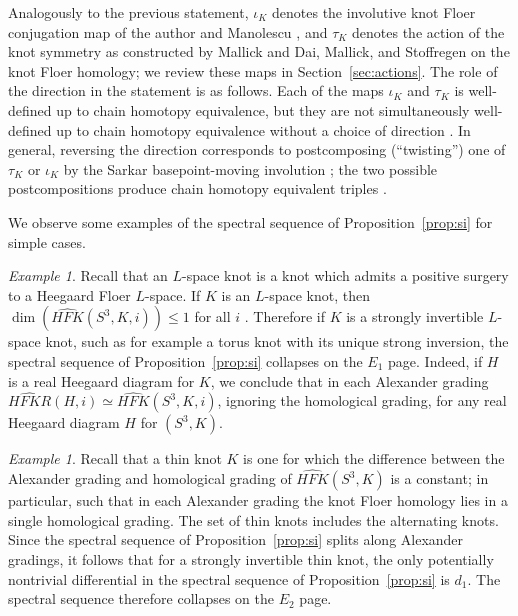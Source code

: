 \documentclass[11pt,reqno]{amsart}
\theoremstyle{definition}
\theoremstyle{remark}
\newtheorem{example}[thm]{Example}
\newcommand{\HFK}{\mathit{HFK}}
\newcommand\HFKhat{\widehat{\HFK}}
\newcommand \HFKR{ \widehat{\mathit{HFKR}}}
\numberwithin{equation}{section}
\begin{document}
Analogously to the previous statement, $\iota_K$ denotes the involutive knot Floer conjugation map of the author and Manolescu \cite{HMInvolutive}, and $\tau_K$ denotes the action of the knot symmetry as constructed by Mallick \cite{Mallick:surgery} and Dai, Mallick, and Stoffregen \cite{DMS:equivariant} on the knot Floer homology; we review these maps in Section~\ref{sec:actions}. The role of the direction in the statement is as follows. Each of the maps $\iota_K$ and $\tau_K$ is well-defined up to chain homotopy equivalence, but they are not simultaneously well-defined up to chain homotopy equivalence without a choice of direction \cite[Section 3.5]{DMS:equivariant}. In general, reversing the direction corresponds to postcomposing (``twisting'') one of $\tau_K$ or $\iota_K$ by the Sarkar basepoint-moving involution \cite{SarkarMovingBasepoints, ZemQuasi}; the two possible postcompositions produce chain homotopy equivalent triples \cite[Lemma 2.21]{DMS:equivariant}.

We observe some examples of the spectral sequence of Proposition~\ref{prop:si} for simple cases.

\begin{example} Recall that an $L$-space knot is a knot which admits a positive surgery to a Heegaard Floer $L$-space. If $K$ is an $L$-space knot, then $\dim(\HFKhat(S^3, K, i)) \leq 1$ for all $i$ \cite{OSlens}. Therefore if $K$ is a strongly invertible $L$-space knot, such as for example a torus knot with its unique strong inversion, the spectral sequence of Proposition~\ref{prop:si} collapses on the $E_1$ page. Indeed, if $H$ is a real Heegaard diagram for $K$, we conclude that in each Alexander grading $\HFKR(H, i) \simeq \HFKhat(S^3,K,i)$, ignoring the homological grading, for any real Heegaard diagram $H$ for $(S^3,K)$. 
\end{example}

\begin{example} Recall that a thin knot $K$ is one for which the difference between the Alexander grading and homological grading of $\HFKhat(S^3,K)$ is a constant; in particular, such that in each Alexander grading the knot Floer homology lies in a single homological grading. The set of thin knots includes the alternating knots. Since the spectral sequence of Proposition~\ref{prop:si} splits along Alexander gradings, it follows that for a strongly invertible thin knot, the only potentially nontrivial differential in the spectral sequence of Proposition~\ref{prop:si} is $d_1$. The spectral sequence therefore collapses on the $E_2$ page. \end{example}
\end{document}
